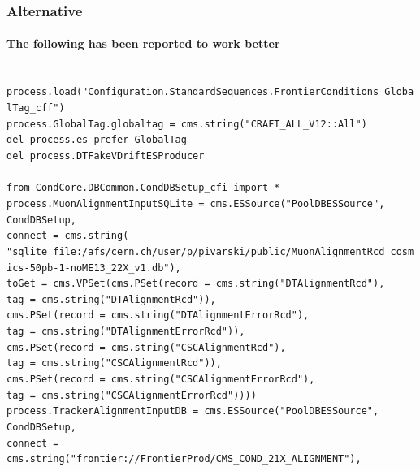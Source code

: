 \documentclass[compress]{beamer}
\begin{document}
\begin{frame}
\frametitle{Alternative}
\framesubtitle{The following has been reported to work better}
\tiny \tt
process.load("Configuration.StandardSequences.FrontierConditions\_GlobalTag\_cff") \\
process.GlobalTag.globaltag = cms.string("CRAFT\_ALL\_V12::All") \\
del process.es\_prefer\_GlobalTag \\
del process.DTFakeVDriftESProducer \\
\mbox{ } \\
from CondCore.DBCommon.CondDBSetup\_cfi import * \\
process.MuonAlignmentInputSQLite = cms.ESSource("PoolDBESSource", \\
\hspace{1 cm}CondDBSetup, \\
\hspace{1 cm}connect = cms.string( \\
"sqlite\_file:/afs/cern.ch/user/p/pivarski/public/MuonAlignmentRcd\_cosmics-50pb-1-noME13\_22X\_v1.db"), \\
\hspace{1.5 cm}toGet = cms.VPSet(cms.PSet(record = cms.string("DTAlignmentRcd"), \\
\hspace{2.5 cm}tag = cms.string("DTAlignmentRcd")), \\
\hspace{2 cm}cms.PSet(record = cms.string("DTAlignmentErrorRcd"), \\
\hspace{2.5 cm}tag = cms.string("DTAlignmentErrorRcd")), \\
\hspace{2 cm}cms.PSet(record = cms.string("CSCAlignmentRcd"), \\
\hspace{2.5 cm}tag = cms.string("CSCAlignmentRcd")), \\
\hspace{2 cm}cms.PSet(record = cms.string("CSCAlignmentErrorRcd"), \\
\hspace{2.5 cm}tag = cms.string("CSCAlignmentErrorRcd")))) \\
process.TrackerAlignmentInputDB = cms.ESSource("PoolDBESSource", \\
\hspace{1 cm}CondDBSetup, \\
\hspace{1 cm}connect = cms.string("frontier://FrontierProd/CMS\_COND\_21X\_ALIGNMENT"), \\

\end{frame}
\end{document}
